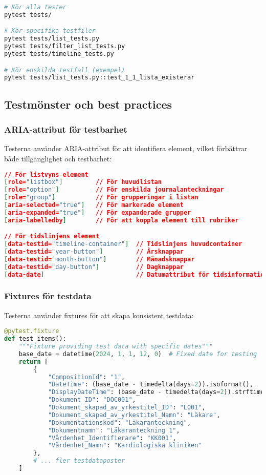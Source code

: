 \begin{lstlisting}[language=bash]
# Kör alla tester
pytest tests/

# Kör specifika testfiler
pytest tests/list_tests.py
pytest tests/filter_list_tests.py
pytest tests/timeline_tests.py

# Kör enskilda testfall (exempel)
pytest tests/list_tests.py::test_1_1_lista_existerar
\end{lstlisting}

\subsection{Testmönster och best practices}

\subsubsection{ARIA-attribut för testbarhet}
Testerna använder ARIA-attribut för att identifiera element, vilket förbättrar både tillgänglighet och testbarhet:

\begin{lstlisting}[language=json]
// För listvyns element
[role="listbox"]         // För huvudlistan
[role="option"]          // För enskilda journalanteckningar
[role="group"]           // För grupperingar i listan
[aria-selected="true"]   // För markerade element
[aria-expanded="true"]   // För expanderade grupper
[aria-labelledby]        // För att koppla element till rubriker

// För tidslinjens element
[data-testid="timeline-container"]  // Tidslinjens huvudcontainer
[data-testid="year-button"]         // Årsknappar
[data-testid="month-button"]        // Månadsknappar
[data-testid="day-button"]          // Dagknappar
[data-date]                         // Datumattribut för tidsinformation
\end{lstlisting}

\subsubsection{Fixtures för testdata}
Testerna använder fixtures för att skapa konsistent testdata:

\begin{lstlisting}[language=python]
@pytest.fixture
def test_items():
    """Fixture providing test data with specific dates"""
    base_date = datetime(2024, 1, 1, 12, 0)  # Fixed date for testing
    return [
        {
            "CompositionId": "1",
            "DateTime": (base_date - timedelta(days=2)).isoformat(),
            "DisplayDateTime": (base_date - timedelta(days=2)).strftime("%Y-%m-%d %H:%M"),
            "Dokument_ID": "DOC001",
            "Dokument_skapad_av_yrkestitel_ID": "L001",
            "Dokument_skapad_av_yrkestitel_Namn": "Läkare",
            "Dokumentationskod": "Läkaranteckning",
            "Dokumentnamn": "Läkaranteckning 1",
            "Vårdenhet_Identifierare": "KK001",
            "Vårdenhet_Namn": "Kardiologiska kliniken"
        },
        # ... fler testdataposter
    ]
\end{lstlisting}

